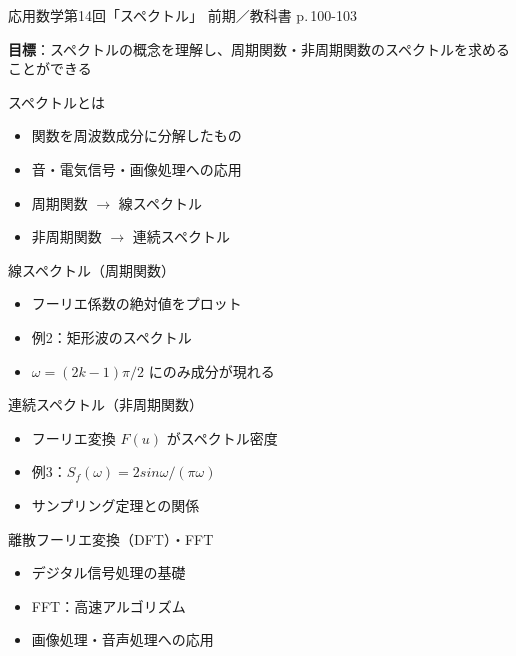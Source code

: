 \documentclass[aspectratio=43,professionalfonts,handout]{beamer}
\newcommand{\LectureNum}{14}
\newcommand{\LectureTitle}{スペクトル}
\newcommand{\TextPages}{p.\,100-103}
\newcommand{\CourseName}{応用数学}
\renewcommand{\TermName}{前期}
\begin{document}
\begin{frame}{\CourseName\quad 第\LectureNum 回「\LectureTitle」}
  {\small \TermName\quad \TeacherName\quad ／\quad 教科書 \TextPages}

  \textbf{目標}：スペクトルの概念を理解し、周期関数・非周期関数のスペクトルを求めることができる

\end{frame}

\begin{frame}{スペクトルとは}
  \begin{block}{}
  \begin{itemize}
    \item 関数を周波数成分に分解したもの
    \item 音・電気信号・画像処理への応用
    \item 周期関数 $ \to $ 線スペクトル
    \item 非周期関数 $ \to $ 連続スペクトル
  \end{itemize}
  \end{block}
\end{frame}

\begin{frame}{線スペクトル（周期関数）}
  \begin{block}{}
  \begin{itemize}
    \item フーリエ係数の絶対値をプロット
    \item 例2：矩形波のスペクトル
    \item $\omega = (2k-1)\pi/2$ にのみ成分が現れる
  \end{itemize}
  \end{block}
\end{frame}

\begin{frame}{連続スペクトル（非周期関数）}
  \begin{block}{}
  \begin{itemize}
    \item フーリエ変換 $F(u)$ がスペクトル密度
    \item 例3：$S_f(\omega) = 2sin \omega/(\pi\omega)$
    \item サンプリング定理との関係
  \end{itemize}
  \end{block}
\end{frame}

\begin{frame}{離散フーリエ変換（DFT）・FFT}
  \begin{block}{}
  \begin{itemize}
    \item デジタル信号処理の基礎
    \item FFT：高速アルゴリズム
    \item 画像処理・音声処理への応用
  \end{itemize}
  \end{block}
\end{frame}
\end{document}
